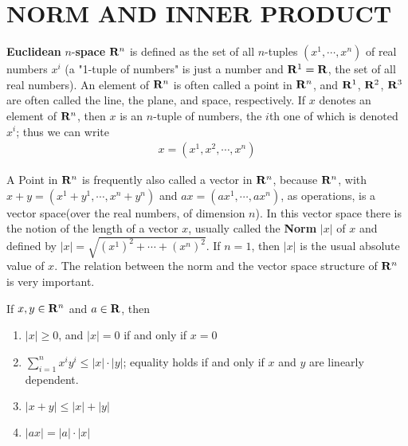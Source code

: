 \section{NORM AND INNER PRODUCT}
\textbf{Euclidean} $n$-\textbf{space} $\mathbf{R}^n$ is defined as the set of all
$n$-tuples $(x^1,\cdots,x^n)$ of real numbers $x^i$ (a "1-tuple of numbers" is 
just a number and $\mathbf{R}^1 = \mathbf{R}$, the set of all real numbers). 
An element of $\mathbf{R}^n$ is often called a point in $\mathbf{R}^n$, and $\mathbf{R}^1$, $\mathbf{R}^2$, $\mathbf{R}^3$
are often called the line, the plane, and space, respectively. 
If $x$ denotes an element of $\mathbf{R}^n$, then $x$ is an $n$-tuple of numbers, the
$i$th one of which is denoted $x^i$; thus we can write 
\begin{align*}
    x = (x^1, x^2, \cdots, x^n)
\end{align*}

A Point in $\mathbf{R}^n$ is frequently also called a vector in $\mathbf{R}^n$,
because $\mathbf{R}^n$, with $x+y = (x^1+y^1, \cdots, x^n+y^n)$ and $ax=(ax^1, \cdots, ax^n)$,
as operations, is a vector space(over the real numbers, of dimension $n$).
In this vector space there is the notion of the length of a vector $x$, usually 
called the \textbf{Norm} $|x|$ of $x$ and defined by $|x| = \sqrt{(x^1)^2 +\cdots + (x^n)^2}$.
If $n=1$, then $|x|$ is the usual absolute value of $x$. 
The relation between the norm and the vector space structure of $\mathbf{R}^n$ is very 
important.

\begin{theorem}
    If $x, y \in \mathbf{R}^n$ and $a\in \mathbf{R}$, then 
    \begin{enumerate}[label={\upshape(\arabic*)}]
        \item $|x| \ge 0$, and $|x| = 0$ if and only if $x=0$ 
        \item $\sum_{i=1}^{n }{x^iy^i} \le |x|\cdot |y|$; equality holds if and only if 
            $x$ and $y$ are linearly dependent.
        \item $|x+y| \le |x| + |y|$
        \item $|ax| = |a|\cdot |x|$
    \end{enumerate}
\end{theorem}

